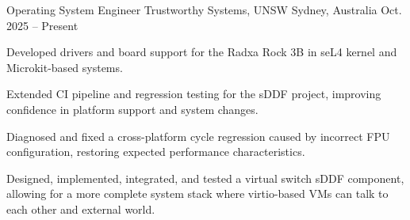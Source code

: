 
\begin{cventries}

  \cventry
  {Operating System Engineer}
  {Trustworthy Systems, UNSW}
  {Sydney, Australia}
  {Oct. 2025 -- Present}
  {
    \begin{cvitems}
      \item {Developed drivers and board support for the Radxa Rock 3B in seL4 kernel and Microkit-based systems.}
      \item {Extended CI pipeline and regression testing for the sDDF project, improving confidence in platform support and system changes.}
      \item {Diagnosed and fixed a cross-platform cycle regression caused by incorrect FPU configuration, restoring expected performance characteristics.}
      \item {Designed, implemented, integrated, and tested a virtual switch sDDF component, allowing for a more complete system stack where virtio-based VMs can talk to each other and external world.}
    \end{cvitems}
  }


\end{cventries}
